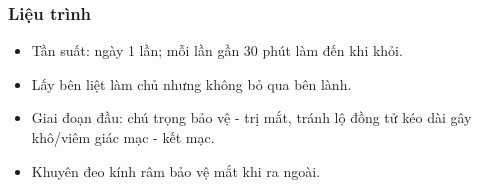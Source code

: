\subsubsection{Liệu trình}

\begin{itemize}
    \item Tần suất: ngày 1 lần; mỗi lần gần 30 phút làm đến khi khỏi.
    \item Lấy bên liệt làm chủ nhưng không bỏ qua bên lành.
    \item Giai đoạn đầu: chú trọng bảo vệ - trị mắt, tránh lộ đồng tử kéo dài gây khô/viêm giác mạc - kết mạc.
    \item Khuyên đeo kính râm bảo vệ mắt khi ra ngoài.
\end{itemize}
